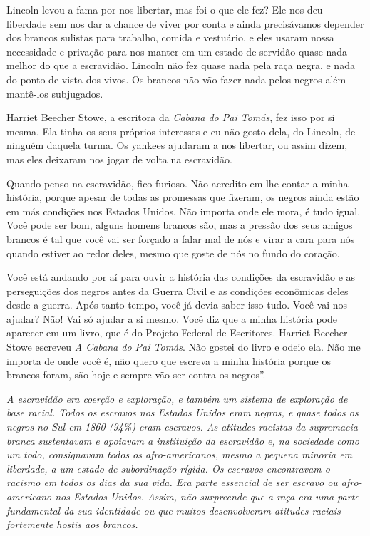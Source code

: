 Lincoln levou a fama por nos libertar, mas foi o que ele fez? Ele nos
deu liberdade sem nos dar a chance de viver por conta e ainda
precisávamos depender dos brancos sulistas para trabalho, comida e
vestuário, e eles usaram nossa necessidade e privação para nos manter em
um estado de servidão quase nada melhor do que a escravidão. Lincoln não
fez quase nada pela raça negra, e nada do ponto de vista dos vivos. Os
brancos não vão fazer nada pelos negros além mantê-los subjugados.

Harriet Beecher Stowe, a escritora da \emph{Cabana do Pai Tomás}, fez
isso por si mesma. Ela tinha os seus próprios interesses e eu não gosto
dela, do Lincoln, de ninguém daquela turma. Os yankees ajudaram a nos
libertar, ou assim dizem, mas eles deixaram nos jogar de volta na
escravidão.

Quando penso na escravidão, fico furioso. Não acredito em lhe contar a
minha história, porque apesar de todas as promessas que fizeram, os
negros ainda estão em más condições nos Estados Unidos. Não importa onde
ele mora, é tudo igual. Você pode ser bom, alguns homens brancos são,
mas a pressão dos seus amigos brancos é tal que você vai ser forçado a
falar mal de nós e virar a cara para nós quando estiver ao redor deles,
mesmo que goste de nós no fundo do coração.

Você está andando por aí para ouvir a história das condições da
escravidão e as perseguições dos negros antes da Guerra Civil e as
condições econômicas deles desde a guerra. Após tanto tempo, você já
devia saber isso tudo. Você vai nos ajudar? Não! Vai só ajudar a si
mesmo. Você diz que a minha história pode aparecer em um livro, que é do
Projeto Federal de Escritores. Harriet Beecher Stowe escreveu \emph{A
Cabana do Pai Tomás}. Não gostei do livro e odeio ela. Não me importa de
onde você é, não quero que escreva a minha história porque os brancos
foram, são hoje e sempre vão ser contra os negros''.

\emph{A escravidão era coerção e exploração, e também um sistema de
exploração de base racial. Todos os escravos nos Estados Unidos eram
negros, e quase todos os negros no Sul em 1860 (94\%) eram escravos. As
atitudes racistas da supremacia branca sustentavam e apoiavam a
instituição da escravidão e, na sociedade como um todo, consignavam
todos os afro-americanos, mesmo a pequena minoria em liberdade, a um
estado de subordinação rígida. Os escravos encontravam o racismo em
todos os dias da sua vida. Era parte essencial de ser escravo ou
afro-americano nos Estados Unidos. Assim, não surpreende que a raça era
uma parte fundamental da sua identidade ou que muitos desenvolveram
atitudes raciais fortemente hostis aos brancos. }

